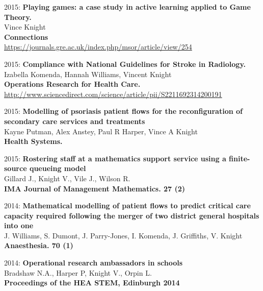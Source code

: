 \documentclass[10pt]{res} %
\begin{document}
\begin{resume}
\begin{etaremune}
\item
2015: \textbf{Playing games: a case study in active learning applied to Game Theory.}\\
Vince Knight
\\
\textbf{Connections}
\\
\url{https://journals.gre.ac.uk/index.php/msor/article/view/254}
\\

\item
2015: \textbf{Compliance with National Guidelines for Stroke in Radiology.}\\
Izabella Komenda, Hannah Williams, Vincent Knight
\\
\textbf{Operations Research for Health Care.}
\\
\url{http://www.sciencedirect.com/science/article/pii/S2211692314200191}
\\

\item
2015: \textbf{Modelling of psoriasis patient flows for the reconfiguration of secondary care services and treatments}\\
Kayne Putman, Alex Anstey, Paul R Harper, Vince A Knight
\\
\textbf{Health Systems.}
\\

\item
2015: \textbf{Rostering staff at a mathematics support service using a finite-source queueing model}\\
Gillard J., Knight V., Vile J., Wilson R.
\\
\textbf{IMA Journal of Management Mathematics. 27 (2)}
\\

\item
2014: \textbf{Mathematical modelling of patient flows to predict critical care capacity required following the merger of two district general hospitals into one}\\
J. Williams, S. Dumont, J. Parry-Jones, I. Komenda, J. Griffiths, V. Knight
\\
\textbf{Anaesthesia. 70 (1)}
\\

\item
2014: \textbf{Operational research ambassadors in schools}\\
Bradshaw N.A., Harper P, Knight V., Orpin L.
\\
\textbf{Proceedings of the HEA STEM, Edinburgh 2014}
\\


\end{etaremune}
\end{resume}
\end{document}
